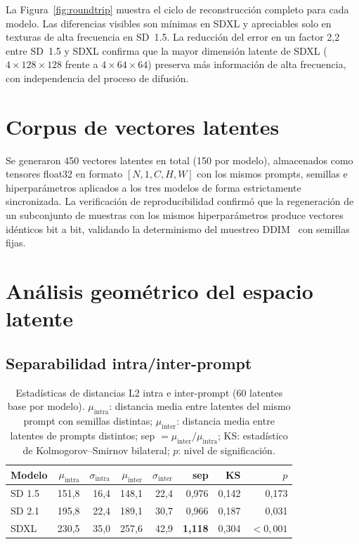 \documentclass[12pt, a4paper, twoside]{book}
\begin{document}
La Figura~\ref{fig:roundtrip} muestra el ciclo de reconstrucción completo para cada modelo.
Las diferencias visibles son mínimas en SDXL y apreciables solo en texturas de alta frecuencia
en SD~1.5. La reducción del error en un factor 2,2 entre SD~1.5 y SDXL confirma que la
mayor dimensión latente de SDXL ($4\times128\times128$ frente a $4\times64\times64$) preserva
más información de alta frecuencia, con independencia del proceso de difusión.

\section{Corpus de vectores latentes}
\label{sec:res:corpus}

Se generaron 450 vectores latentes en total (150 por modelo), almacenados como tensores
float32 en formato $[N, 1, C, H, W]$ con los mismos prompts, semillas e hiperparámetros
aplicados a los tres modelos de forma estrictamente sincronizada.
La verificación de reproducibilidad confirmó que la regeneración de un subconjunto de muestras
con los mismos hiperparámetros produce vectores idénticos bit a bit, validando la determinismo
del muestreo DDIM~\citep{song2021ddim} con semillas fijas.

\section{Análisis geométrico del espacio latente}
\label{sec:res:geometrico}

\subsection{Separabilidad intra/inter-prompt}
\label{subsec:res:separabilidad}

\begin{table}[htb]
\centering
\caption{Estadísticas de distancias L2 intra e inter-prompt (60 latentes base por modelo).
$\mu_\text{intra}$: distancia media entre latentes del mismo prompt con semillas distintas;
$\mu_\text{inter}$: distancia media entre latentes de prompts distintos;
sep $= \mu_\text{inter} / \mu_\text{intra}$; KS: estadístico de Kolmogorov--Smirnov bilateral;
$p$: nivel de significación.}
\label{tab:separabilidad}
\small
\begin{tabular}{lrrrrrrr}
\toprule
\textbf{Modelo} & $\mu_\text{intra}$ & $\sigma_\text{intra}$ & $\mu_\text{inter}$ &
$\sigma_\text{inter}$ & \textbf{sep} & \textbf{KS} & \textbf{$p$} \\
\midrule
SD 1.5 & 151,8 & 16,4 & 148,1 & 22,4 & 0,976 & 0,142 & 0,173 \\
SD 2.1 & 195,8 & 22,4 & 189,1 & 30,7 & 0,966 & 0,187 & 0,031 \\
SDXL   & 230,5 & 35,0 & 257,6 & 42,9 & \textbf{1,118} & 0,304 & $<{0{,}001}$ \\
\bottomrule
\end{tabular}
\end{table}
\end{document}
